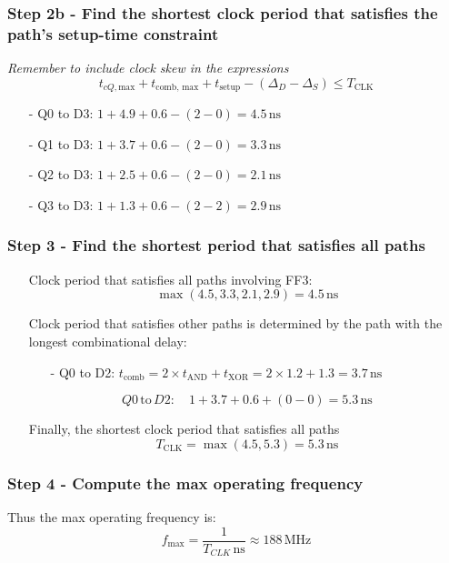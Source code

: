 \documentclass[12pt,openany]{book}
\begin{document}
\subsubsection*{Step 2b -  Find the shortest clock period that satisfies the path's setup-time constraint}
\textit{Remember to include clock skew in the expressions}
\[
t_{cQ, \text{max}} + t_{\text{comb, max}} + t_{\text{setup}} - (\Delta_D - \Delta_S) \leq T_{\text{CLK}}
\]

\begin{center}
	\begin{itemize}
	    \item[-] Q0 to D3: \( 1 + 4.9 + 0.6 - (2 - 0) = 4.5 \, \text{ns} \)
	    \item[-] Q1 to D3: \( 1 + 3.7 + 0.6 - (2 - 0) = 3.3 \, \text{ns} \)
	    \item[-] Q2 to D3: \( 1 + 2.5 + 0.6 - (2 - 0) = 2.1 \, \text{ns} \)
	    \item[-] Q3 to D3: \( 1 + 1.3 + 0.6 - (2 - 2) = 2.9 \, \text{ns} \)
	\end{itemize}
\end{center}

\subsubsection*{Step 3 - Find the shortest period that satisfies all paths}
\begin{itemize}
    \item[] Clock period that satisfies all paths involving FF3:
    \[
    \max (4.5, 3.3, 2.1, 2.9) = 4.5 \, \text{ns}
    \]
    \item[] Clock period that satisfies other paths is determined by the path with the longest combinational delay:
    \begin{itemize}
        \item[-] Q0 to D2: \( t_{\text{comb}} = 2 \times t_{\text{AND}} + t_{\text{XOR}} = 2 \times 1.2 + 1.3 = 3.7 \, \text{ns} \)
    \end{itemize}
    \[
    Q0 \, \text{to} \, D2: \quad 1 + 3.7 + 0.6 + (0 - 0) = 5.3 \, \text{ns}
    \]
    \item[] Finally, the shortest clock period that satisfies all paths
    \[
    T_{\text{CLK}} = \max (4.5, 5.3) = 5.3 \, \text{ns}
    \]
\end{itemize}
\subsubsection*{Step 4 - Compute the max operating frequency}
Thus the max operating frequency is:
$$f_{\text{max}} = \frac{1}{T_{CLK}\, \text{ns}} \approx 188 \, \text{MHz}$$
\end{document}
